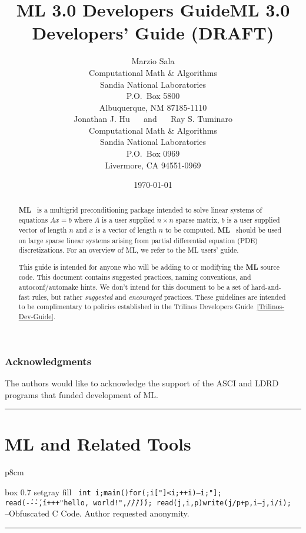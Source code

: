 \documentclass[10pt,letter,relax]{SANDreport}
\title{ML 3.0 Developers Guide}
\title{ML 3.0 Developers' Guide (DRAFT)}
\author{
Marzio  Sala \\
Computational Math \& Algorithms \\
Sandia National Laboratories\\
P.O.~Box 5800 \\
Albuquerque, NM 87185-1110\\[20pt]
Jonathan J. Hu $\quad$ and $\quad$
Ray S. Tuminaro \\
Computational Math \& Algorithms \\
Sandia National Laboratories\\
P.O.~Box 0969 \\
Livermore, CA 94551-0969\\
}
\date{\today}
\newcommand{\HRule}{\noindent\rule{\linewidth}{1mm}}
\newcommand{\ML}     {{\bf ML }}
\begin{document}
\maketitle

\begin{abstract}
\ML\ is a multigrid preconditioning package intended to solve linear systems
 of equations $A x = b$ where $A$ is a user supplied $n \times n$ sparse
matrix, $b$ is a user supplied vector of length $n$ and $x$ is a vector of
length $n$ to be computed. \ML\ should be used on large sparse linear
systems arising from partial differential equation (PDE) discretizations.
For an overview of ML, we refer to the ML users' guide.

This guide is intended for anyone who will be adding to or modifying the \ML
source code.  This document contains suggested practices, naming conventions,
and autoconf/automake hints.  We don't intend for this document to be a set
of hard-and-fast rules, but rather {\em suggested} and {\em encouraged}
practices. These guidelines are intended to be complimentary to policies
established in the Trilinos Developers Guide~\ref{Trilinos-Dev-Guide}.
\end{abstract}

\clearpage

\section*{Acknowledgments}
The authors would like to acknowledge the support of the ASCI and LDRD 
programs that funded development of ML.

\clearpage

\SANDmain

\tableofcontents

\clearpage
\newpage


\vspace*{3cm}
\HRule
\part{ML and Related Tools}
\bigskip

\hfill
\begin{tabular}{p{8cm}}
\begin{boxitpara}{box 0.7 setgray fill}
{\tt
        int
        i;main(){for(;i["]<i;++i){--i;}"]; read(\'-\'-\'-\',i+++"hello,
          world!",\'/\'/\'/\'));} read(j,i,p){write(j/p+p,i---j,i/i);}
}
--Obfuscated C Code. Author requested anonymity. 
\end{boxitpara}
\end{tabular}
\HRule
\end{document}
